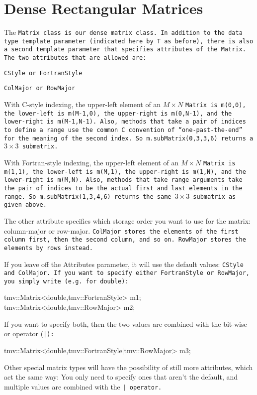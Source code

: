 
\section{Dense Rectangular Matrices}
\label{Matrix}

The \tt{Matrix} class is our dense matrix class. 
In addition to the data type template parameter (indicated here by \tt{T} as before),
there is also a second template parameter that specifies attributes of the
\tt{Matrix}.  The two attributes that are allowed are:
\begin{description} \itemsep -2pt
\item[$\bullet$] \tt{CStyle} or \tt{FortranStyle}
\item[$\bullet$] \tt{ColMajor} or \tt{RowMajor}
\end{description}

With C-style indexing, the upper-left element of an $M \times N$ \tt{Matrix} is
\tt{m(0,0)}, the lower-left is \tt{m(M-1,0)}, the upper-right is \tt{m(0,N-1)},
and the lower-right is \tt{m(M-1,N-1)}.  Also, methods that take a pair of 
indices to define a range use the common C convention of ``one-past-the-end'' 
for the meaning of the second index.
So \tt{m.subMatrix(0,3,3,6)} returns a $3 \times 3$ submatrix.

With Fortran-style indexing, the upper-left element of an $M \times N$ \tt{Matrix}
is \tt{m(1,1)}, the lower-left is \tt{m(M,1)}, the upper-right is \tt{m(1,N)},
and the lower-right is \tt{m(M,N)}.  Also, methods that take range arguments
take the pair of indices to be the actual first and last elements in the range.
So \tt{m.subMatrix(1,3,4,6)} returns the same $3 \times 3$ submatrix as given above.

The other attribute specifies which storage order you want to use for the 
matrix: column-major or row-major.  \tt{ColMajor} stores the elements of the 
first column first, then the second column, and so on.  \tt{RowMajor} stores
the elements by rows instead. 

If you leave off the Attributes parameter, it will use the default values:
\tt{CStyle} and \tt{ColMajor}.  If you want to specify either \tt{FortranStyle}
or \tt{RowMajor}, you simply write (e.g. for double):
\begin{tmvcode}
tmv::Matrix<double,tmv::FortranStyle> m1;
tmv::Matrix<double,tmv::RowMajor> m2;
\end{tmvcode}
If you want to specify both, then the two values are combined with the 
bit-wise or operator (\tt{|}):
\begin{tmvcode}
tmv::Matrix<double,tmv::FortranStyle|tmv::RowMajor> m3;
\end{tmvcode}
Other special matrix types will have the possibility of still more 
attributes, which act the same way: You only need to specify ones that
aren't the default, and multiple values are combined with the \tt{|} 
operator.

